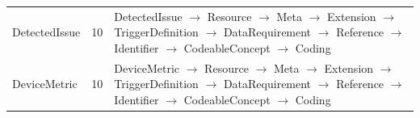 \begin{longtable}{lrl}
DetectedIssue & 10 & DetectedIssue $\rightarrow$ Resource $\rightarrow$ Meta $\rightarrow$ Extension $\rightarrow$ TriggerDefinition $\rightarrow$ DataRequirement $\rightarrow$ Reference $\rightarrow$ Identifier $\rightarrow$ CodeableConcept $\rightarrow$ Coding \\
DeviceMetric & 10 & DeviceMetric $\rightarrow$ Resource $\rightarrow$ Meta $\rightarrow$ Extension $\rightarrow$ TriggerDefinition $\rightarrow$ DataRequirement $\rightarrow$ Reference $\rightarrow$ Identifier $\rightarrow$ CodeableConcept $\rightarrow$ Coding \\
\end{longtable}
